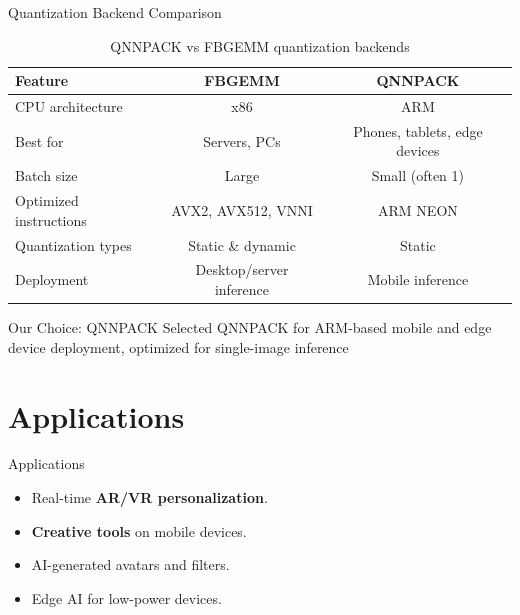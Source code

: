 \documentclass[aspectratio=169,xcolor=dvipsnames]{beamer}
\begin{document}
\begin{frame}{Quantization Backend Comparison}
    \begin{table}
        \centering
        \footnotesize
        \begin{tabular}{l c c}
            \toprule
            \textbf{Feature} & \textbf{FBGEMM} & \textbf{QNNPACK} \\
            \midrule
            CPU architecture & x86 & ARM \\
            Best for & Servers, PCs & Phones, tablets, edge devices \\
            Batch size & Large & Small (often 1) \\
            Optimized instructions & AVX2, AVX512, VNNI & ARM NEON \\
            Quantization types & Static \& dynamic & Static \\
            Deployment & Desktop/server inference & Mobile inference \\
            \bottomrule
        \end{tabular}
        \caption{QNNPACK vs FBGEMM quantization backends}
    \end{table}
    
    \vspace{0.3cm}
    
    \begin{block}{Our Choice: QNNPACK}
        Selected QNNPACK for ARM-based mobile and edge device deployment, optimized for single-image inference
    \end{block}
\end{frame}

\section{Applications}

\begin{frame}{Applications}
    \begin{itemize}
        \item Real-time \textbf{AR/VR personalization}.
        \item \textbf{Creative tools} on mobile devices.
        \item AI-generated avatars and filters.
        \item Edge AI for low-power devices.
    \end{itemize}
\end{frame}
\end{document}
